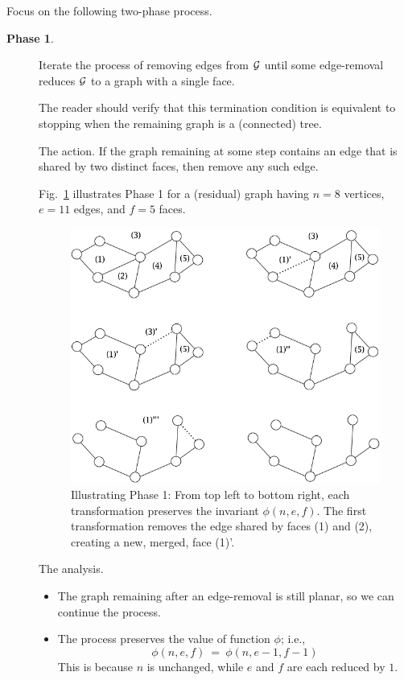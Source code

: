 \noindent
Focus on the following two-phase process.
\begin{description}
\item[{\bf Phase 1}.]
Iterate the process of removing edges from $\mbox{$\cal G$}$ until some edge-removal reduces $\mbox{$\cal G$}$ to a graph with a single face.

\smallskip

The reader should verify that this termination condition is equivalent to stopping when the remaining graph is a (connected) tree.

\medskip

{\sf The action}.
If the graph remaining at some step contains an edge that is shared by two distinct faces, then remove any such edge.

\smallskip

Fig.~\ref{fig:planarStep1} illustrates Phase 1 for a (residual) graph having $n=8$ vertices, $e=11$ edges, and $f=5$ faces.
\begin{figure}[hbt]
\begin{center}
   \includegraphics[scale=0.35]{FiguresGraph/planarStep1}
\caption{Illustrating Phase 1: From top left to bottom right, each transformation preserves the invariant $\phi(n,e,f)$.  The first transformation removes the edge shared by faces (1) and (2), creating a new, merged, face (1)'.}
  \label{fig:planarStep1}
\end{center}
\end{figure}

\medskip

{\sf The analysis}.
\begin{itemize}
\item
The graph remaining after an edge-removal is still planar, so we can continue the process.
\item
The process preserves the value of function $\phi$; i.e.,
\[ \phi(n,e,f) \ = \ \phi(n,e-1,f-1) \]
This is because $n$ is unchanged, while $e$ and $f$ are each reduced by $1$.
\end{itemize}


\end{description}

